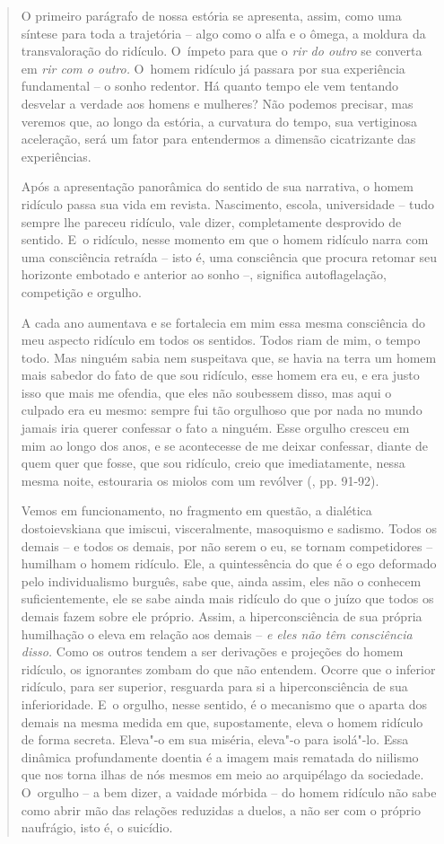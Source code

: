 {\begin{quote}
O primeiro parágrafo de nossa estória se apresenta, assim, como uma
síntese para toda a trajetória -- algo como o alfa e o ômega, a moldura
da transvaloração do ridículo. O~ímpeto para que o \emph{rir do outro}
se converta em \emph{rir com o outro.} O~homem ridículo já passara por
sua experiência fundamental -- o sonho redentor. Há quanto tempo ele vem
tentando desvelar a verdade aos homens e mulheres? Não podemos precisar,
mas veremos que, ao longo da estória, a curvatura do tempo, sua
vertiginosa aceleração, será um fator para entendermos a dimensão
cicatrizante das experiências.

Após a apresentação panorâmica do sentido de sua narrativa, o homem
ridículo passa sua vida em revista. Nascimento, escola, universidade --
tudo sempre lhe pareceu ridículo, vale dizer, completamente desprovido
de sentido. E~o ridículo, nesse momento em que o homem ridículo narra
com uma consciência retraída -- isto é, uma consciência que procura
retomar seu horizonte embotado e anterior ao sonho --, significa
autoflagelação, competição e orgulho.

A cada ano aumentava e se fortalecia em mim essa mesma consciência do
meu aspecto ridículo em todos os sentidos. Todos riam de mim, o tempo
todo. Mas ninguém sabia nem suspeitava que, se havia na terra um homem
mais sabedor do fato de que sou ridículo, esse homem era eu, e era justo
isso que mais me ofendia, que eles não soubessem disso, mas aqui o
culpado era eu mesmo: sempre fui tão orgulhoso que por nada no mundo
jamais iria querer confessar o fato a ninguém. Esse orgulho cresceu em
mim ao longo dos anos, e se acontecesse de me deixar confessar, diante
de quem quer que fosse, que sou ridículo, creio que imediatamente, nessa
mesma noite, estouraria os miolos com um revólver (, pp. 91-92).

Vemos em funcionamento, no fragmento em questão, a dialética
dostoievskiana que imiscui, visceralmente, masoquismo e sadismo. Todos
os demais -- e todos os demais, por não serem o eu, se tornam
competidores -- humilham o homem ridículo. Ele, a quintessência do que é
o ego deformado pelo individualismo burguês, sabe que, ainda assim, eles
não o conhecem suficientemente, ele se sabe ainda mais ridículo do que o
juízo que todos os demais fazem sobre ele próprio. Assim, a
hiperconsciência de sua própria humilhação o eleva em relação aos demais
-- \emph{e eles não têm consciência disso.} Como os outros tendem a ser
derivações e projeções do homem ridículo, os ignorantes zombam do que
não entendem. Ocorre que o inferior ridículo, para ser superior,
resguarda para si a hiperconsciência de sua inferioridade. E~o orgulho,
nesse sentido, é o mecanismo que o aparta dos demais na mesma medida em
que, supostamente, eleva o homem ridículo de forma secreta. Eleva"-o em
sua miséria, eleva"-o para isolá"-lo. Essa dinâmica profundamente doentia
é a imagem mais rematada do niilismo que nos torna ilhas de nós mesmos
em meio ao arquipélago da sociedade. O~orgulho -- a bem dizer, a vaidade
mórbida -- do homem ridículo não sabe como abrir mão das relações
reduzidas a duelos, a não ser com o próprio naufrágio, isto é, o
suicídio.


\end{quote}}

